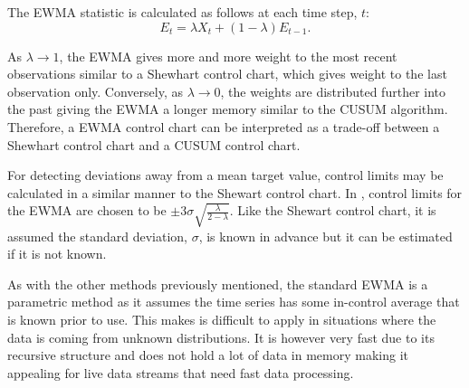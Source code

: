 The EWMA statistic is calculated as follows at each time step, $t$:
$$E_t = \lambda X_t + (1-\lambda)E_{t-1}. $$

As $\lambda \to 1$, the EWMA gives more and more weight to the most recent observations similar to a Shewhart control chart, which gives weight to the last observation only. Conversely, as $\lambda \to 0$, the weights are distributed further into the past giving the EWMA a longer memory similar to the CUSUM algorithm. Therefore, a EWMA control chart can be interpreted as a trade-off between a Shewhart control chart and a CUSUM control chart. 

For detecting deviations away from a mean target value, control limits may be calculated in a similar manner to the Shewart control chart. In \cite{hunter1986exponentially}, control limits for the EWMA are chosen to be  $\pm 3 \sigma \sqrt{\frac{\lambda}{2-\lambda}}$.  Like the Shewart control chart, it is assumed the standard deviation, $\sigma$, is known in advance but it can be estimated if it is not known. %


As with the other methods previously mentioned, the standard EWMA is a parametric method as it assumes the time series has some in-control average that is known prior to use. This makes is difficult to apply in situations where the data is coming from unknown distributions. It is however very fast due to its recursive structure and does not hold a lot of data in memory making it appealing for live data streams that need fast data processing.